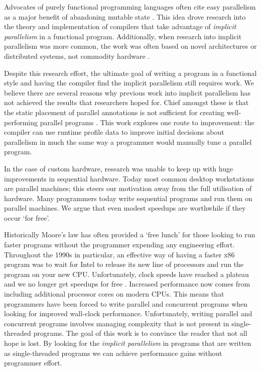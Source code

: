 Advocates of purely functional programming languages often cite easy
parallelism as a major benefit of abandoning mutable state
\citep{hughes:thesis, SPJ:PIFPL}. This idea drove research into the theory and
implementation of compilers that take advantage of \emph{implicit parallelism}
in a functional program. Additionally, when research into implicit parallelism
was more common, the work was often based on novel architectures or distributed
systems, not commodity hardware \citep{GRIP, hammond2000research}. 

Despite this research effort, the ultimate goal of writing a program in a
functional style and having the compiler find the implicit parallelism still
requires work.  We believe there are several reasons why previous work into
implicit parallelism has not achieved the results that researchers hoped for.
Chief amongst these is that the static placement of parallel
annotations is not sufficient for creating well-performing parallel programs
\citep{hammond2000research, hogen1992automatic, tremblay1995impact,
feedbackImplicit}. This work explores one route to improvement: the compiler
can use runtime profile data to improve initial decisions about parallelism in
much the same way a programmer would manually tune a parallel program.

In the case of custom hardware, research was unable to keep up with huge
improvements in sequential hardware. Today most common desktop workstations are
parallel machines; this steers our motivation away from the full utilisation of
hardware. Many programmers today write sequential programs and run them on
parallel machines. We argue that even modest speedups are worthwhile if they
occur `for free'.

Historically Moore's law has often provided a `free lunch' for those looking to
run faster programs without the programmer expending any engineering effort.
Throughout the 1990s in particular, an effective way of having a faster x86
program was to wait for Intel\texttrademark{} to release its new line of
processors and run the program on your new CPU. Unfortunately, clock speeds
have reached a plateau and we no longer get speedups for free
\citep{sutter2005free}. Increased performance now comes from including
additional processor cores on modern CPUs.  This means that programmers have
been forced to write parallel and concurrent programs when looking for improved
wall-clock performance. Unfortunately, writing parallel and concurrent programs
involves managing complexity that is not present in single-threaded programs.
The goal of this work is to convince the reader that not all hope is lost. By
looking for the \emph{implicit parallelism} in programs that are written as
single-threaded programs we can achieve performance gains without programmer
effort.

